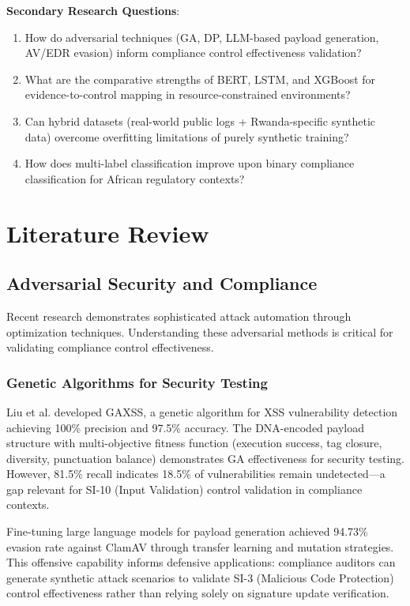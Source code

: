 \documentclass[11pt,conference]{IEEEtran}
\begin{document}
\textbf{Secondary Research Questions}:
\begin{enumerate}
    \item How do adversarial techniques (GA, DP, LLM-based payload generation, AV/EDR evasion) inform compliance control effectiveness validation?
    \item What are the comparative strengths of BERT, LSTM, and XGBoost for evidence-to-control mapping in resource-constrained environments?
    \item Can hybrid datasets (real-world public logs + Rwanda-specific synthetic data) overcome overfitting limitations of purely synthetic training?
    \item How does multi-label classification improve upon binary compliance classification for African regulatory contexts?
\end{enumerate}

\section{Literature Review}

\subsection{Adversarial Security and Compliance}

Recent research demonstrates sophisticated attack automation through optimization techniques. Understanding these adversarial methods is critical for validating compliance control effectiveness.

\subsubsection{Genetic Algorithms for Security Testing}

Liu et al. \cite{ga_xss_paper} developed GAXSS, a genetic algorithm for XSS vulnerability detection achieving 100\% precision and 97.5\% accuracy. The DNA-encoded payload structure with multi-objective fitness function (execution success, tag closure, diversity, punctuation balance) demonstrates GA effectiveness for security testing. However, 81.5\% recall indicates 18.5\% of vulnerabilities remain undetected—a gap relevant for SI-10 (Input Validation) control validation in compliance contexts.

Fine-tuning large language models for payload generation \cite{llm_payload_paper} achieved 94.73\% evasion rate against ClamAV through transfer learning and mutation strategies. This offensive capability informs defensive applications: compliance auditors can generate synthetic attack scenarios to validate SI-3 (Malicious Code Protection) control effectiveness rather than relying solely on signature update verification.
\end{document}
